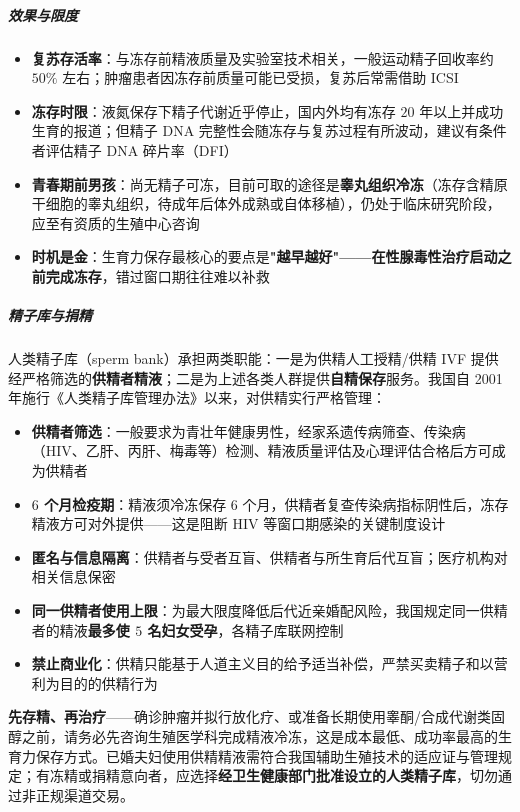 \subparagraph{效果与限度}

\begin{itemize}
	\item \textbf{复苏存活率}：与冻存前精液质量及实验室技术相关，一般运动精子回收率约 $50\%$ 左右；肿瘤患者因冻存前质量可能已受损，复苏后常需借助 ICSI
	\item \textbf{冻存时限}：液氮保存下精子代谢近乎停止，国内外均有冻存 $20$ 年以上并成功生育的报道；但精子 DNA 完整性会随冻存与复苏过程有所波动，建议有条件者评估精子 DNA 碎片率（DFI）
	\item \textbf{青春期前男孩}：尚无精子可冻，目前可取的途径是\textbf{睾丸组织冷冻}（冻存含精原干细胞的睾丸组织，待成年后体外成熟或自体移植），仍处于临床研究阶段，应至有资质的生殖中心咨询
	\item \textbf{时机是金}：生育力保存最核心的要点是\textbf{"越早越好"——在性腺毒性治疗启动之前完成冻存}，错过窗口期往往难以补救
\end{itemize}

\subparagraph{精子库与捐精}

人类精子库（sperm bank）承担两类职能：一是为供精人工授精/供精 IVF 提供经严格筛选的\textbf{供精者精液}；二是为上述各类人群提供\textbf{自精保存}服务。我国自 2001 年施行《人类精子库管理办法》以来，对供精实行严格管理：

\begin{itemize}
	\item \textbf{供精者筛选}：一般要求为青壮年健康男性，经家系遗传病筛查、传染病（HIV、乙肝、丙肝、梅毒等）检测、精液质量评估及心理评估合格后方可成为供精者
	\item \textbf{$6$ 个月检疫期}：精液须冷冻保存 $6$ 个月，供精者复查传染病指标阴性后，冻存精液方可对外提供——这是阻断 HIV 等窗口期感染的关键制度设计
	\item \textbf{匿名与信息隔离}：供精者与受者互盲、供精者与所生育后代互盲；医疗机构对相关信息保密
	\item \textbf{同一供精者使用上限}：为最大限度降低后代近亲婚配风险，我国规定同一供精者的精液\textbf{最多使 $5$ 名妇女受孕}，各精子库联网控制
	\item \textbf{禁止商业化}：供精只能基于人道主义目的给予适当补偿，严禁买卖精子和以营利为目的的供精行为
\end{itemize}

\begin{tcolorbox}[colback=pink!5!white,colframe=red!50!black,title=贴心小叮咛]
\textbf{先存精、再治疗}——确诊肿瘤并拟行放化疗、或准备长期使用睾酮/合成代谢类固醇之前，请务必先咨询生殖医学科完成精液冷冻，这是成本最低、成功率最高的生育力保存方式。已婚夫妇使用供精精液需符合我国辅助生殖技术的适应证与管理规定；有冻精或捐精意向者，应选择\textbf{经卫生健康部门批准设立的人类精子库}，切勿通过非正规渠道交易。
\end{tcolorbox}

